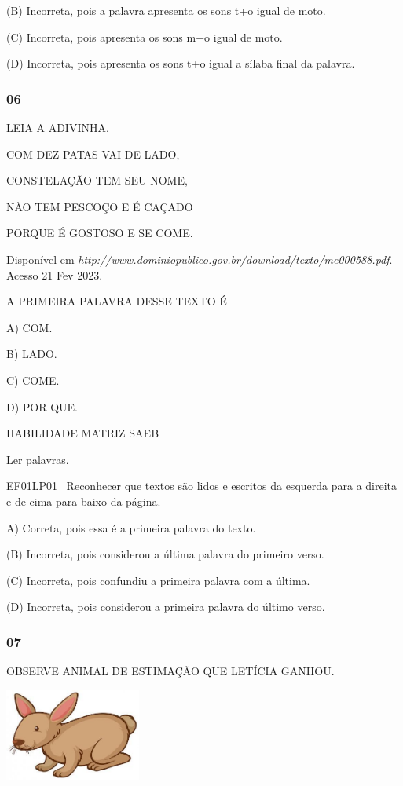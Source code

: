 \begin{escola}
(B) Incorreta, pois a palavra apresenta os sons t+o igual de moto.

(C) Incorreta, pois apresenta os sons m+o igual de moto.

(D) Incorreta, pois apresenta os sons t+o igual a sílaba final da
palavra.

\subsubsection{06}\label{section-78}

LEIA A ADIVINHA.

COM DEZ PATAS VAI DE LADO,

CONSTELAÇÃO TEM SEU NOME,

NÃO TEM PESCOÇO E É CAÇADO

PORQUE É GOSTOSO E SE COME.

Disponível em
\href{http://www.dominiopublico.gov.br/download/texto/me000588.pdf}{\emph{http://www.dominiopublico.gov.br/download/texto/me000588.pdf}}.
Acesso 21 Fev 2023.

A PRIMEIRA PALAVRA DESSE TEXTO É

A) COM.

B) LADO.

C) COME.

D) POR QUE.

HABILIDADE MATRIZ SAEB

Ler palavras.

EF01LP01 ~Reconhecer que textos são lidos e escritos da esquerda para a
direita e de cima para baixo da página.

A) Correta, pois essa é a primeira palavra do texto.

(B) Incorreta, pois considerou a última palavra do primeiro verso.

(C) Incorreta, pois confundiu a primeira palavra com a última.

(D) Incorreta, pois considerou a primeira palavra do último
verso.\protect\hypertarget{_heading=h.bww9mmn8u5sl}{}{}

\subsubsection{07}\label{section-79}

OBSERVE ANIMAL DE ESTIMAÇÃO QUE LETÍCIA GANHOU.

\includegraphics[width=1.75903in,height=1.18611in]{media/image246.jpg}


\end{escola}
